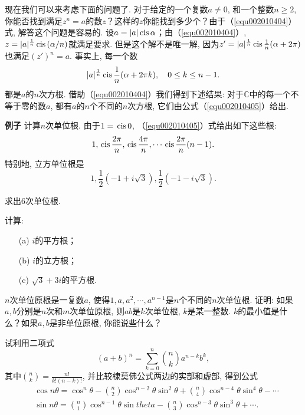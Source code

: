 现在我们可以来考虑下面的问题了. 对于给定的一个复数$a \neq 0$, 和一个整数$n \ge 2$, 你能否找到满足$z^n=a$的数$z$？这样的$z$你能找到多少个？由于（\ref{equ002010404}）式, 解答这个问题是容易的. 设$a=|a|\,\text{cis}\,{\alpha}$；由（\ref{equ002010404}）, $z=|a|^{\frac{1}{n}}\,\text{cis}\,{(\alpha/n)}$就满足要求. 但是这个解不是唯一解, 因为$z'=|a|^{\frac{1}{n}}\,\text{cis}\,{\frac{1}{n}(\alpha+2\pi)}$也满足$(z')^n=a$. 事实上, 每一个数
\begin{gather}\label{equ002010405}
|a|^{\frac{1}{n}}\,\text{cis}\,{\frac{1}{n}(\alpha+2\pi{}k)}, \quad 0 \le k \le n-1.
\end{gather}
都是$a$的$n$次方根. 借助（\ref{equ002010404}）我们得到下述结果: 对于$\mathbb{C}$中的每一个不等于零的数$a$, 都有$a$的$n$个不同的$n$次方根, 它们由公式（\ref{equ002010405}）给出. 

\textbf{例子} \quad 计算$n$次单位根. 由于$1=\,\text{cis}\,{0}$, （\ref{equ002010405}）式给出如下这些根: 
\[
1,\,\text{cis}\,{\frac{2\pi}{n}},\,\text{cis}\,{\frac{4\pi}{n}},\cdots\,\text{cis}\,{\frac{2\pi}{n}(n-1)}.
\]
特别地, 立方单位根是
\[
1, \frac{1}{2}(-1 + i\sqrt{3}),\frac{1}{2}(-1-i\sqrt{3}).
\]

\begin{exercise}
求出6次单位根. 
\end{exercise}

\begin{exercise}
计算: 
\begin{enumerate}
\item[(a)]$i$的平方根；
\item[(b)]$i$的立方根；
\item[(c)]$\sqrt{3}+3i$的平方根. 
\end{enumerate}
\end{exercise}

\begin{exercise}
$n$次单位原根是一复数$a$, 使得$1,a,a^2,\cdots,a^{n-1}$是$n$个不同的$n$次单位根. 证明: 如果$a,b$分别是$n$次和$m$次单位原根, 则$ab$是$k$次单位根, $k$是某一整数. $k$的最小值是什么？如果$a,b$是非单位原根, 你能说些什么？
\end{exercise}

\begin{exercise}
试利用二项式
\[
(a+b)^n=\sum_{k=0}^{n}{{n \choose k}a^{n-k}b^{k}},
\]
其中${n \choose k}=\frac{n!}{k!(n-k)!}$, 并比较棣莫佛公式两边的实部和虚部, 得到公式
\[
\begin{aligned}
&\cos{n\theta} = \cos^{n}{\theta} - {n \choose 2}\cos^{n-2}{\theta}\sin^{2}{\theta} + {n \choose 4}\cos^{n-4}{\theta}\sin^{4}{\theta}-\cdots\\
&\sin{n\theta} = {n \choose 1}\cos^{n-1}{\theta}\sin{theta}-{n \choose 3}\cos^{n-3}{\theta}\sin^{3}{\theta}+\cdots.
\end{aligned}
\]
\end{exercise}

